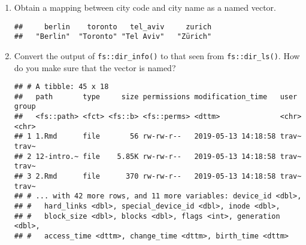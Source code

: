 \documentclass[]{book}
\newenvironment{Shaded}{\begin{snugshade}}{\end{snugshade}}
\newcommand{\CommentTok}[1]{\textcolor[rgb]{0.56,0.35,0.01}{\textit{#1}}}
\newcommand{\KeywordTok}[1]{\textcolor[rgb]{0.13,0.29,0.53}{\textbf{#1}}}
\newcommand{\NormalTok}[1]{#1}
\newcommand{\OperatorTok}[1]{\textcolor[rgb]{0.81,0.36,0.00}{\textbf{#1}}}
\newcommand{\StringTok}[1]{\textcolor[rgb]{0.31,0.60,0.02}{#1}}
\begin{document}
\begin{enumerate}
\def\labelenumi{\arabic{enumi}.}
\item
  Obtain a mapping between city code and city name as a named vector.

\begin{Shaded}
\end{Shaded}

\begin{verbatim}
##     berlin    toronto   tel_aviv     zurich 
##   "Berlin"  "Toronto" "Tel Aviv"   "Zürich"
\end{verbatim}
\item
  Convert the output of \texttt{fs::dir\_info()} to that seen from \texttt{fs::dir\_ls()}. How do you make sure that the vector is named?

\begin{Shaded}
\end{Shaded}

\begin{verbatim}
## # A tibble: 45 x 18
##   path       type     size permissions modification_time   user  group
##   <fs::path> <fct> <fs::b> <fs::perms> <dttm>              <chr> <chr>
## 1 1.Rmd      file       56 rw-rw-r--   2019-05-13 14:18:58 trav~ trav~
## 2 12-intro.~ file    5.85K rw-rw-r--   2019-05-13 14:18:58 trav~ trav~
## 3 2.Rmd      file      370 rw-rw-r--   2019-05-13 14:18:58 trav~ trav~
## # ... with 42 more rows, and 11 more variables: device_id <dbl>,
## #   hard_links <dbl>, special_device_id <dbl>, inode <dbl>,
## #   block_size <dbl>, blocks <dbl>, flags <int>, generation <dbl>,
## #   access_time <dttm>, change_time <dttm>, birth_time <dttm>
\end{verbatim}


\end{enumerate}
\end{document}
